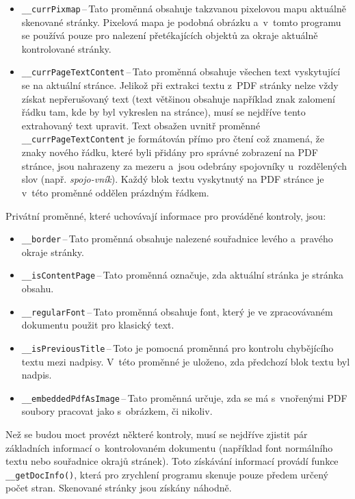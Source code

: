 \begin{itemize}
    \item \texttt{\_\_currPixmap}\,--\,Tato proměnná obsahuje takzvanou pixelovou
    mapu aktuálně skenované stránky. Pixelová mapa je podobná obrázku a~v~tomto
    programu se používá pouze pro nalezení přetékajících objektů za okraje
    aktuálně kontrolované stránky.
    
    \item \texttt{\_\_currPageTextContent}\,--\,Tato proměnná obsahuje
    všechen text vyskytující se na aktuální stránce. Jelikož při extrakci textu
    z~PDF stránky nelze vždy získat nepřerušovaný text (text většinou obsahuje
    například znak zalomení řádku tam, kde by byl vykreslen na stránce), 
    musí se nejdříve tento extrahovaný text upravit.
    Text obsažen uvnitř proměnné \texttt{\_\_currPageTextContent} je formátován
    přímo pro čtení což znamená, že znaky nového řádku, které byli přidány pro správné 
    zobrazení na PDF stránce, jsou nahrazeny za mezeru a~jsou odebrány
    spojovníky u~rozdělených slov (např. \emph{spojo-vník}). Každý blok textu
    vyskytnutý na PDF stránce je v~této proměnné
    oddělen prázdným řádkem. 
\end{itemize}
Privátní proměnné, které uchovávají informace pro prováděné kontroly, jsou: 
\begin{itemize}
    \item \texttt{\_\_border}\,--\,Tato proměnná obsahuje nalezené souřadnice 
    levého a~pravého okraje stránky.
    \item \texttt{\_\_isContentPage}\,--\,Tato proměnná
    označuje, zda aktuální stránka je stránka obsahu.
    \item \texttt{\_\_regularFont}\,--\,Tato proměnná obsahuje
    font, který je ve zpracovávaném dokumentu použit pro klasický text.
    \item \texttt{\_\_isPreviousTitle}\,--\,Toto je pomocná proměnná pro
    kontrolu chybějícího textu mezi nadpisy. V~této proměnné je uloženo,
    zda předchozí blok textu byl nadpis.
    \item \texttt{\_\_embeddedPdfAsImage}\,--\,Tato proměnná určuje, zda se
    má s~vnořenými PDF soubory pracovat jako s~obrázkem, či nikoliv.
\end{itemize} 

Než se budou moct provézt některé kontroly, musí se nejdříve zjistit pár
základních informací o~kontrolovaném dokumentu (například font normálního textu
nebo souřadnice okrajů stránek). Toto získávání informací provádí funkce
\texttt{\_\_getDocInfo()}, která pro zrychlení programu skenuje pouze předem
určený počet stran. Skenované stránky jsou získány náhodně.

